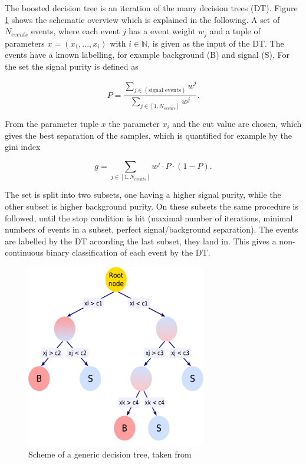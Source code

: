 The boosted decision tree is an iteration of the many decision trees (\gls{DT}). Figure \ref{fig:fig_3_10} shows the schematic overview which is explained in the following. A set of $N_{events}$ events, where each event $j$ has a event weight $w_{j}$ and a tuple of parameters $x = (x_{1}, ... , x_{i})$ with $i \in \mathbb{N}$, is given as the input of the \gls{DT}. The events have a known labelling, for example background (B) and signal (S). For the set the signal purity is defined as

\begin{equation}
	\label{eq:eq_3_10}
	P = \frac{\sum_{j \in (\text{signal events})} w^{j}}{\sum_{j \in [1, N_{events}]} w^{j}}.
\end{equation}

From the parameter tuple $x$ the parameter $x_{i}$ and the cut value are chosen, which gives the best separation of the samples, which is quantified for example by the gini index 

\begin{equation}
	\label{eq:eq_3_11}
	g = \sum_{j \in [1, N_{events}]} w^{j} \cdot P \cdot (1-P).
\end{equation}

The set is split into two subsets, one having a higher signal purity, while the other subset is higher background purity. On these subsets the same procedure is followed, until the stop condition is hit (maximal number of iterations, minimal numbers of events in a subset, perfect signal/background separation). The events are labelled by the \gls{DT} according the last subset, they land in. This gives a non-continuous binary classification of each event by the \gls{DT}. \\

\begin{figure}[htp]
	\centering
	\includegraphics[width=0.7\textwidth]{pictures/DT.pdf}

	\caption[DT scheme]{Scheme of a generic decision tree, taken from \cite{TMVA}}
	\label{fig:fig_3_10}
\end{figure}


